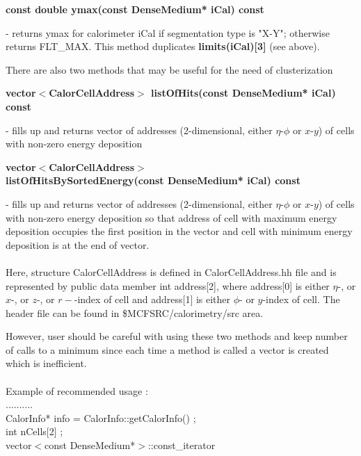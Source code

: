 \begin{center}
   {\bf const double ymax(const DenseMedium* iCal) const }
\end{center}
   - returns ymax for calorimeter iCal if segmentation type is "X-Y";
   otherwise returns FLT\_MAX. This method duplicates {\bf limits(iCal)[3]}
   (see above).


\bigskip

\bigskip

   There are also two methods that may be useful for the need of clusterization
   
   
\begin{center}
   {\bf vector$<$CalorCellAddress$>$ listOfHits(const DenseMedium* iCal) const }
\end{center}
   - fills up and returns vector of addresses (2-dimensional, either $\eta$-$\phi$
   or $x$-$y$) of cells with non-zero energy deposition 

\begin{center}
   {\bf vector$<$CalorCellAddress$>$ \\
   listOfHitsBySortedEnergy(const DenseMedium* iCal) const }
\end{center}
   - fills up and returns vector of addresses (2-dimensional, either $\eta$-$\phi$
   or $x$-$y$) of cells with non-zero energy deposition so that address of cell
   with maximum energy deposition occupies the first position in the vector
   and cell with minimum energy deposition is at the end of vector. \\
   \\
   Here, structure CalorCellAddress is defined in CalorCellAddress.hh file and is 
   represented by public data member int address[2], where address[0] is either $\eta$-, 
   or $x$-, or $z$-, or $r-$-index of cell and address[1] is either $\phi$- or $y$-index of cell.
   The header file can be found in \$MCFSRC/calorimetry/src area.

   However, user should be careful with using these two methods and keep number
   of calls to a minimum since each time a method is called a vector is created 
   which is inefficient.\\
   \\ 
   Example of recommended usage :\\
   ..........\\
   CalorInfo* info = CalorInfo::getCalorInfo() ;\\
   int nCells[2] ;\\
   vector$<$const DenseMedium*$>$::const\_iterator 

